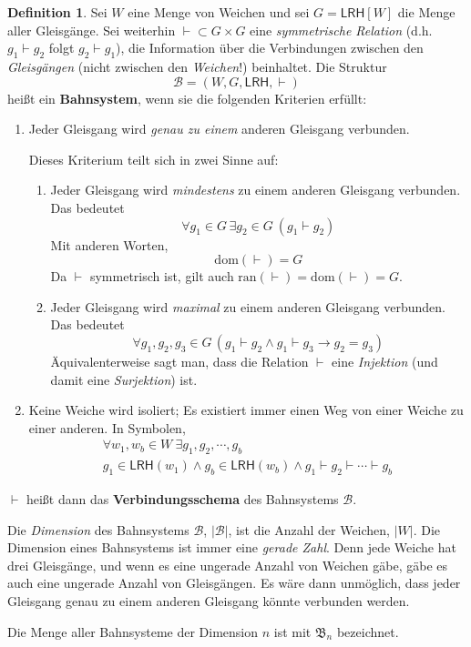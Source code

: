 \documentclass{article}
\theoremstyle{definition}
\newtheorem{defi}{Definition}
\newcommand{\connec}{\vdash}
\newcommand{\lrh}{\mathsf{LRH}}
\begin{document}
    \begin{defi}
	Sei $W$ eine Menge von Weichen und sei $G=\lrh[W]$ die Menge aller Gleisgänge. Sei weiterhin ${\connec}\subset G\times G$ eine \textit{symmetrische Relation} (d.h.\ $g_1\connec g_2$ folgt $g_2\connec g_1$), die Information über die Verbindungen zwischen den \textit{Gleisgängen} (nicht zwischen den \textit{Weichen}!) beinhaltet. Die Struktur
	\[ \mathcal{B}=(W,G,\lrh,\connec) \]
	heißt ein \textbf{Bahnsystem}, wenn sie die folgenden Kriterien erfüllt:
	\begin{enumerate}[label=\roman*., ref=(\roman*)]
	    \item Jeder Gleisgang wird \textit{genau zu einem} anderen Gleisgang verbunden.
		\label{Bd:i}

		Dieses Kriterium teilt sich in zwei Sinne auf:
		\begin{enumerate}[label*=\arabic*.]
		    \item Jeder Gleisgang wird \textit{mindestens} zu einem anderen Gleisgang verbunden. Das bedeutet
			\[ \forall g_1\in G\,\exists g_2\in G\ (g_1\connec g_2) \]
			Mit anderen Worten,
			\[ \mathrm{dom}(\connec) = G \]
			Da $\connec$ symmetrisch ist, gilt auch $\mathrm{ran}(\connec)=\mathrm{dom}(\connec)=G$.
		    \item Jeder Gleisgang wird \textit{maximal} zu einem anderen Gleisgang verbunden. Das bedeutet
			\[ \forall g_1,g_2,g_3\in G\,(g_1\connec g_2\land g_1\connec g_3 \to g_2=g_3) \]
			Äquivalenterweise sagt man, dass die Relation $\connec$ eine \textit{Injektion} (und damit eine \textit{Surjektion}) ist.
		\end{enumerate}

	    \item Keine Weiche wird isoliert; Es existiert immer einen Weg von einer Weiche zu einer anderen. In Symbolen,
		\begin{gather*}
		    \forall w_1,w_b\in W\ \exists g_1,g_2,\cdots,g_b \\
		    g_1\in\lrh(w_1)\land g_b\in\lrh(w_b)\land g_1\connec g_2\connec\cdots\connec g_b
		\end{gather*}
	\end{enumerate}
	$\connec$ heißt dann das \textbf{Verbindungsschema} des Bahnsystems $\mathcal{B}$.

	Die \textit{Dimension} des Bahnsystems $\mathcal{B}$, $|\mathcal{B}|$, ist die Anzahl der Weichen, $|W|$. Die Dimension eines Bahnsystems ist immer eine \textit{gerade Zahl}. Denn jede Weiche hat drei Gleisgänge, und wenn es eine ungerade Anzahl von Weichen gäbe, gäbe es auch eine ungerade Anzahl von Gleisgängen. Es wäre dann unmöglich, dass jeder Gleisgang genau zu einem anderen Gleisgang könnte verbunden werden.

	Die Menge aller Bahnsysteme der Dimension $n$ ist mit $\mathfrak{B}_n$ bezeichnet.
    \end{defi}
\end{document}
